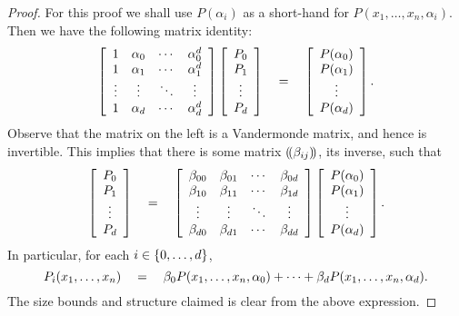 \begin{proof}
For this proof we shall use $P(\alpha_i)$ as a short-hand for $P(x_1,\ldots, x_n, \alpha_i)$. Then we have the following matrix identity:
\[
\left[\begin{array}{cccc}
1 & \alpha_0 & \cdots & \alpha_0^d\\
1 & \alpha_1 & \cdots & \alpha_1^d\\
\vdots & \vdots & \ddots & \vdots\\
1 & \alpha_d & \cdots & \alpha_d^d
\end{array}\right] \left[\begin{array}{c}
P_0\\
P_1 \\
\vdots\\
P_d
\end{array}\right] \quad = \quad
\left[\begin{array}{c}
P(\alpha_0)\\
P(\alpha_1) \\
\vdots\\
P(\alpha_d)
\end{array}\right].
\]
Observe that the matrix on the left is a Vandermonde matrix, and hence is invertible. This implies that there is some matrix $\left(\!\left(\beta_{ij}\right)\!\right)$, its inverse, such that
\[
\left[\begin{array}{c}
P_0\\
P_1 \\
\vdots\\
P_d
\end{array}\right] \quad = \quad
\left[\begin{array}{cccc}
\beta_{00} & \beta_{01} & \cdots & \beta_{0d}\\
\beta_{10} & \beta_{11} & \cdots & \beta_{1d}\\
\vdots & \vdots & \ddots & \vdots\\
\beta_{d0} & \beta_{d1} & \cdots & \beta_{dd}
\end{array}\right] 
\left[\begin{array}{c}
P(\alpha_0)\\
P(\alpha_1) \\
\vdots\\
P(\alpha_d)
\end{array}\right].
\]
In particular, for each $i \in \left\{0,\ldots, d\right\}$,
\[
P_i(x_1,\ldots, x_n) \quad = \quad \beta_0 P(x_1,\ldots, x_n, \alpha_0) + \cdots + \beta_d P(x_1,\ldots, x_n, \alpha_d). 
\]
The size bounds and structure claimed is clear from the above expression.
\end{proof}


